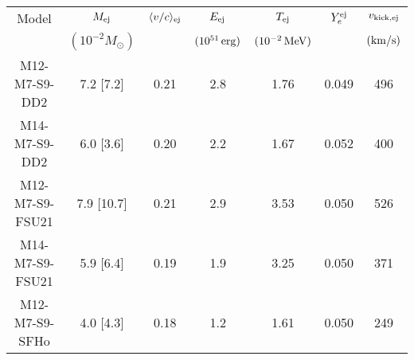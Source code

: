\begin{tabular}{c cc cccc}
	\toprule \toprule
	Model & $M_{\rm ej}$ & $\langle v/c \rangle_{\rm ej}$ & $E_{\rm ej}$ & $T_{\rm ej}$ & $Y_e^{\rm ej}$ & $v_{\rm kick,ej}$ 
    \\
          & $(10^{-2} M_\odot)$ & & $(10^{51} \, {\rm erg})$ & $(10^{-2}{\rm \, MeV})$ & & $({\rm km/s})$
	\\
	\midrule
	M12-M7-S9-DD2 & 7.2 [7.2] & 0.21 & 2.8 & 1.76 & 0.049 & 496\\
	M14-M7-S9-DD2 &  6.0 [3.6] & 0.20 & 2.2 & 1.67 & 0.052 & 400 \\
	M12-M7-S9-FSU21 & 7.9 [10.7] & 0.21 & 2.9 & 3.53 & 0.050 & 526 \\
	M14-M7-S9-FSU21 & 5.9 [6.4] & 0.19 & 1.9 & 3.25 & 0.050 & 371 \\
	M12-M7-S9-SFHo & 4.0 [4.3] & 0.18 & 1.2 & 1.61 & 0.050 & 249 \\
	\bottomrule \bottomrule
\end{tabular}